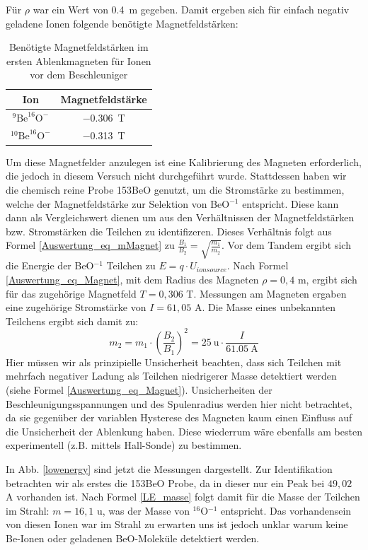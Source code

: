 Für $\rho$ war ein Wert von \SI{0.4}{\metre} gegeben.
Damit ergeben sich für einfach negativ geladene Ionen folgende benötigte Magnetfeldstärken:
\begin{table}[h]
  \centering
  \begin{tabular}{|c|c|}
    \hline
    Ion & Magnetfeldstärke \\
    \hline
    $^{9}\text{Be}^{16}\text{O}^{-}$ & \SI{-0.306}{\tesla} \\
    \hline
    $^{10}\text{Be}^{16}\text{O}^{-}$ & \SI{-0.313}{\tesla} \\
    \hline
  \end{tabular}
  \caption{Benötigte Magnetfeldstärken im ersten Ablenkmagneten für Ionen vor dem Beschleuniger}
  \label{Auswertung_tab_Ionenenergien_vor_Besch}
\end{table}
Um diese Magnetfelder anzulegen ist eine Kalibrierung des Magneten erforderlich, die jedoch in diesem Versuch nicht durchgeführt wurde.
Stattdessen haben wir die chemisch reine Probe 153BeO genutzt, um die Stromstärke zu bestimmen, welche der Magnetfeldstärke zur Selektion von BeO$^{-1}$ entspricht.
Diese kann dann als Vergleichswert dienen um aus den Verhältnissen der Magnetfeldstärken bzw. Stromstärken die Teilchen zu identifizeren.
Dieses Verhältnis folgt aus Formel \ref{Auswertung_eq_mMagnet} zu $\frac{B_1}{B_2} = \sqrt{\frac{m_1}{m_2}}$.
Vor dem Tandem ergibt sich die Energie der BeO$^{-1}$ Teilchen zu $E = q \cdot U_{ionsource}$.
Nach Formel \ref{Auswertung_eq_Magnet}, mit dem Radius des Magneten $\rho = 0,4$ m, ergibt sich für das zugehörige Magnetfeld $T = 0,306$ T.
Messungen am Magneten ergaben eine zugehörige Stromstärke von $I = 61,05$ A.
Die Masse eines unbekannten Teilchens ergibt sich damit zu:
\begin{equation}
    m_2 = m_1 \cdot \left( \frac{B_2}{B_1} \right)^2 = 25 \: \text{u} \cdot \frac{I}{61.05 \: \text{A}}
    \label{LE_masse}
\end{equation}
Hier müssen wir als prinzipielle Unsicherheit beachten, dass sich Teilchen mit mehrfach negativer Ladung als Teilchen niedrigerer Masse detektiert werden (siehe Formel \ref{Auswertung_eq_Magnet}).
Unsicherheiten der Beschleunigungsspannungen und des Spulenradius werden hier nicht betrachtet, da sie gegenüber der variablen Hysterese des Magneten kaum einen Einfluss auf die Unsicherheit der Ablenkung haben.
Diese wiederrum wäre ebenfalls am besten experimentell (z.B. mittels Hall-Sonde) zu bestimmen.

In Abb. \ref{lowenergy} sind jetzt die Messungen dargestellt.
Zur Identifikation betrachten wir als erstes die 153BeO Probe, da in dieser nur ein Peak bei $49,02$ A vorhanden ist.
Nach Formel \ref{LE_masse} folgt damit für die Masse der Teilchen im Strahl: $m = 16,1$ u, was der Masse von $^{16}$O$^{-1}$ entspricht.
Das vorhandensein von diesen Ionen war im Strahl zu erwarten uns ist jedoch unklar warum keine Be-Ionen oder geladenen BeO-Moleküle detektiert werden.

